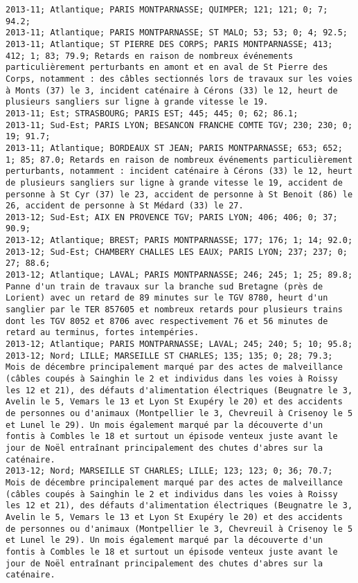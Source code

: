 \documentclass{article}
\begin{document}
\begin{Verbatim}[commandchars=\\\{\}]
2013-11; Atlantique; PARIS MONTPARNASSE; QUIMPER; 121; 121; 0; 7; 94.2; 
2013-11; Atlantique; PARIS MONTPARNASSE; ST MALO; 53; 53; 0; 4; 92.5; 
2013-11; Atlantique; ST PIERRE DES CORPS; PARIS MONTPARNASSE; 413; 412; 1; 83; 79.9; Retards en raison de nombreux événements particulièrement perturbants en amont et en aval de St Pierre des Corps, notamment : des câbles sectionnés lors de travaux sur les voies à Monts (37) le 3, incident caténaire à Cérons (33) le 12, heurt de plusieurs sangliers sur ligne à grande vitesse le 19.
2013-11; Est; STRASBOURG; PARIS EST; 445; 445; 0; 62; 86.1; 
2013-11; Sud-Est; PARIS LYON; BESANCON FRANCHE COMTE TGV; 230; 230; 0; 19; 91.7; 
2013-11; Atlantique; BORDEAUX ST JEAN; PARIS MONTPARNASSE; 653; 652; 1; 85; 87.0; Retards en raison de nombreux événements particulièrement perturbants, notamment : incident caténaire à Cérons (33) le 12, heurt de plusieurs sangliers sur ligne à grande vitesse le 19, accident de personne à St Cyr (37) le 23, accident de personne à St Benoit (86) le 26, accident de personne à St Médard (33) le 27.
2013-12; Sud-Est; AIX EN PROVENCE TGV; PARIS LYON; 406; 406; 0; 37; 90.9; 
2013-12; Atlantique; BREST; PARIS MONTPARNASSE; 177; 176; 1; 14; 92.0; 
2013-12; Sud-Est; CHAMBERY CHALLES LES EAUX; PARIS LYON; 237; 237; 0; 27; 88.6; 
2013-12; Atlantique; LAVAL; PARIS MONTPARNASSE; 246; 245; 1; 25; 89.8; Panne d'un train de travaux sur la branche sud Bretagne (près de Lorient) avec un retard de 89 minutes sur le TGV 8780, heurt d'un sanglier par le TER 857605 et nombreux retards pour plusieurs trains dont les TGV 8052 et 8706 avec respectivement 76 et 56 minutes de retard au terminus, fortes intempéries.
2013-12; Atlantique; PARIS MONTPARNASSE; LAVAL; 245; 240; 5; 10; 95.8; 
2013-12; Nord; LILLE; MARSEILLE ST CHARLES; 135; 135; 0; 28; 79.3; Mois de décembre principalement marqué par des actes de malveillance (câbles coupés à Sainghin le 2 et individus dans les voies à Roissy les 12 et 21), des défauts d'alimentation électriques (Beugnatre le 3, Avelin le 5, Vemars le 13 et Lyon St Exupéry le 20) et des accidents de personnes ou d'animaux (Montpellier le 3, Chevreuil à Crisenoy le 5 et Lunel le 29). Un mois également marqué par la découverte d'un fontis à Combles le 18 et surtout un épisode venteux juste avant le jour de Noël entraînant principalement des chutes d'abres sur la caténaire.
2013-12; Nord; MARSEILLE ST CHARLES; LILLE; 123; 123; 0; 36; 70.7; Mois de décembre principalement marqué par des actes de malveillance (câbles coupés à Sainghin le 2 et individus dans les voies à Roissy les 12 et 21), des défauts d'alimentation électriques (Beugnatre le 3, Avelin le 5, Vemars le 13 et Lyon St Exupéry le 20) et des accidents de personnes ou d'animaux (Montpellier le 3, Chevreuil à Crisenoy le 5 et Lunel le 29). Un mois également marqué par la découverte d'un fontis à Combles le 18 et surtout un épisode venteux juste avant le jour de Noël entraînant principalement des chutes d'abres sur la caténaire.

\end{Verbatim}
\end{document}

